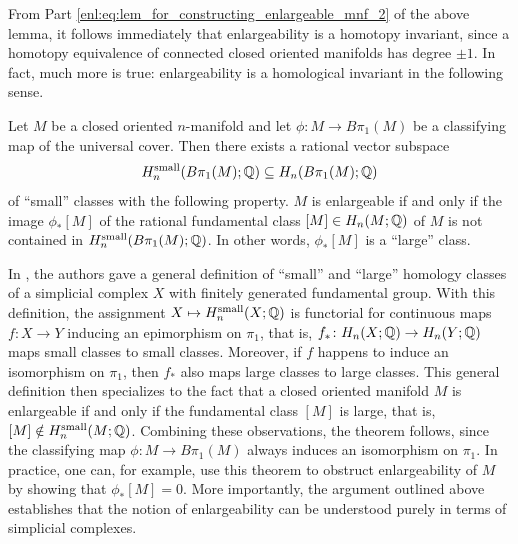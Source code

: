 From Part \ref{enl:eq:lem_for_constructing_enlargeable_mnf_2} of the above lemma, it follows immediately that enlargeability is a homotopy invariant, since a homotopy equivalence of connected closed oriented manifolds has degree $\pm 1$. In fact, much more is true: enlargeability is a homological invariant in the following sense. 

\begin{theorem}
    Let $M$ be a closed oriented $n$-manifold and let \linebreak $\phi \colon M \to B\pi_1(M)$ be a classifying map of the universal cover. Then there exists a rational vector subspace 
    \[
    H_n^\mathrm{small}(B\pi_1(M);\mathbb{Q}) \subseteq H_n(B\pi_1(M);\mathbb{Q})
    \]
    of ``small'' classes with the following property. $M$ is enlargeable if and only if the image $\phi_\ast [M]$ of the rational fundamental class $[M] \in H_n(M;\mathbb{Q})$ of $M$ is not contained in  $H_n^\mathrm{small}(B\pi_1(M);\mathbb{Q})$. In other words, $\phi_\ast [M]$ is a ``large'' class.
\end{theorem}

 In \cite{BrunnbauerHanke}, the authors gave a general definition of ``small'' and ``large'' homology classes of a simplicial complex $X$ with finitely generated fundamental group. With this definition, the assignment $X \mapsto H_n^\mathrm{small}(X;\mathbb{Q})$ is functorial for continuous maps $f \colon X \to Y$ inducing an epimorphism on $\pi_1$, that is, $f_\ast \colon H_n(X;\mathbb{Q}) \to H_n(Y;\mathbb{Q})$ maps small classes to small classes. Moreover, if $f$ happens to induce an isomorphism on $\pi_1$, then $f_\ast$ also maps large classes to large classes. This general definition then specializes to the fact that a closed oriented manifold $M$ is enlargeable if and only if the fundamental class $[M]$ is large, that is, $[M] \notin H_n^\mathrm{small}(M;\mathbb{Q})$. Combining these observations, the theorem follows, since the classifying map $\phi \colon M \to B\pi_1(M)$ always induces an isomorphism on $\pi_1$. In practice, one can, for example, use this theorem to obstruct enlargeability of $M$ by showing that $\phi_\ast [M] = 0$. More importantly, the argument outlined above establishes that the notion of enlargeability can be understood purely in terms of simplicial complexes.